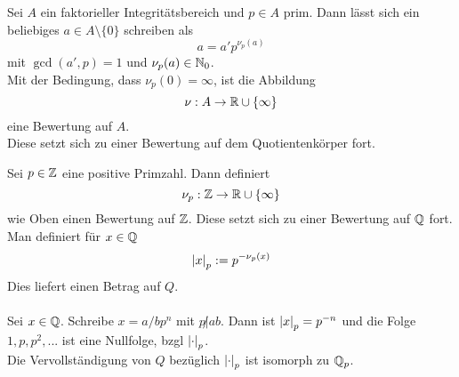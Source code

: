 	\begin{exmlist}
		\begin{exm}
			Sei $A$ ein faktorieller Integritätsbereich und $p\in A$ prim. Dann lässt sich ein beliebiges $a\in A\setminus\{0\}$ schreiben als
			 \[a=a'p^{\nu_p(a)}\]
			 mit $\gcd(a',p)=1$ und $\nu_p(a)\in\mathbb{N}_0$.\\
			 Mit der Bedingung, dass $\nu_p(0)=\infty$, ist die Abbildung
			 \[\nu:A\to\mathbb{R}\cup\{\infty\}\]
			 eine Bewertung auf $A$.\\
			 Diese setzt sich zu einer Bewertung auf dem Quotientenkörper fort.
		\end{exm}
		\begin{exm}
			Sei $p\in \mathbb{Z}$ eine positive Primzahl. Dann definiert
			\[\nu_p:\mathbb{Z}\to\mathbb{R}\cup\{\infty\}\]
			wie Oben einen Bewertung auf $\mathbb{Z}$. Diese setzt sich zu einer Bewertung auf $\mathbb{Q}$ fort. Man definiert für $x\in\mathbb{Q}$ 
			\[\left|x\right|_p:=p^{-\nu_p(x)}\]
			Dies liefert einen Betrag auf $Q$.\\
			\\
			Sei $x\in\mathbb{Q}$. Schreibe $x=a/bp^n$ mit $p\not|ab$. Dann ist $\left|x\right|_p=p^{-n}$ und die Folge $1,p,p^2,...$ ist eine Nullfolge, bzgl $\left|\cdot\right|_p$.\\
			Die Vervollständigung von $Q$ bezüglich $\left|\cdot\right|_p$ ist isomorph zu $\mathbb{Q}_p$.
		\end{exm}
	\end{exmlist}

